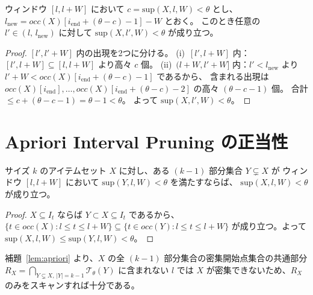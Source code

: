 \begin{lemma}[非密集フェーズの正当性]\label{lem:stride_sparse}
ウィンドウ $[l, l+W]$ において $c = \mathrm{sup}(X, l, W) < \theta$ とし、
$l_{\mathrm{new}} = \mathit{occ}(X)[i_{\mathrm{end}} + (\theta-c) - 1] - W$ とおく。
このとき任意の $l' \in (l,\, l_{\mathrm{new}})$ に対して
$\mathrm{sup}(X, l', W) < \theta$ が成り立つ。
\end{lemma}

\begin{proof}
$[l', l'+W]$ 内の出現を2つに分ける。
(i)~$[l', l+W]$ 内：$[l', l+W] \subseteq [l, l+W]$ より高々 $c$ 個。
(ii)~$(l+W, l'+W]$ 内：$l' < l_{\mathrm{new}}$ より $l'+W < \mathit{occ}(X)[i_{\mathrm{end}}+(\theta-c)-1]$ であるから、
含まれる出現は $\mathit{occ}(X)[i_{\mathrm{end}}], \ldots, \mathit{occ}(X)[i_{\mathrm{end}}+(\theta-c)-2]$ の高々 $(\theta-c-1)$ 個。
合計 $\leq c + (\theta-c-1) = \theta - 1 < \theta$。
よって $\mathrm{sup}(X, l', W) < \theta$。
\end{proof}

\section{Apriori Interval Pruning の正当性}

\begin{lemma}[反単調性による候補区間制限]\label{lem:apriori}
サイズ $k$ のアイテムセット $X$ に対し、ある $(k{-}1)$ 部分集合 $Y \subsetneq X$ が
ウィンドウ $[l, l+W]$ において $\mathrm{sup}(Y, l, W) < \theta$ を満たすならば、
$\mathrm{sup}(X, l, W) < \theta$ が成り立つ。
\end{lemma}

\begin{proof}
$X \subseteq I_t$ ならば $Y \subset X \subseteq I_t$ であるから、
$\{t \in \mathit{occ}(X) : l \leq t \leq l+W\} \subseteq \{t \in \mathit{occ}(Y) : l \leq t \leq l+W\}$
が成り立つ。よって $\mathrm{sup}(X, l, W) \leq \mathrm{sup}(Y, l, W) < \theta$。
\end{proof}

補題~\ref{lem:apriori} より、$X$ の全 $(k{-}1)$ 部分集合の密集開始点集合の共通部分
$R_X = \bigcap_{Y \subsetneq X,\, |Y|=k-1} \mathcal{T}_\theta(Y)$
に含まれない $l$ では $X$ が密集できないため、$R_X$ のみをスキャンすれば十分である。

